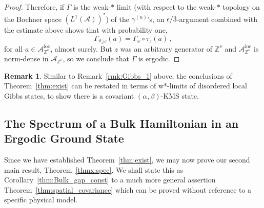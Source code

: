 \documentclass{article}
\newcommand{\Znu}{\mathbb{Z}^\nu}
\newcommand{\A}{\mathcal{A}}
\DeclareMathOperator{\loc}{loc}
\newcommand{\aloc}{\mathcal{A}_{\mathbb{Z}^\nu}^{\loc}}
\newcommand{\<}{\langle}
\renewcommand{\>}{\rangle}
\theoremstyle{definition}
\newtheorem{rmk}[thm]{Remark}
\numberwithin{equation}{section}
\begin{document}
\begin{proof}
	Therefore, if $\Gamma$ is the weak-$\ast$ limit (with respect to the weak-$\ast$ topology on the Bochner space $(L^1(\A))^*$) of the $\gamma^{(n)}$'s, an $\epsilon/3$-argument combined with the estimate above shows that with probability one,
	\begin{equation}
		\Gamma_{\vartheta_z \omega}(a) = \Gamma_\omega\circ \tau_z(a)\,,
	\end{equation} for all $a\in \aloc$, almost surely. But $z$ was an arbitrary generator of $\Znu$ and $\aloc$ is norm-dense in $\A_{\Znu}$, so we conclude that $\Gamma$ is ergodic. 
\end{proof}

\begin{rmk}
    Similar to Remark~\ref{rmk:Gibbs_1} above, the conclusions of Theorem~\ref{thm:exist} can be restated in terms of w*-limits of disordered local Gibbs states, to show there is a covariant $(\alpha, \beta)$-KMS state. 
\end{rmk}

\subsection{The Spectrum of a Bulk Hamiltonian in an Ergodic Ground State}
Since we have established Theorem~\ref{thm:exist}, we may now prove our second main result, Theorem~\ref{thmx:spec}. We shall state this as Corollary~\ref{thm:Bulk_gap_const} to a much more general assertion Theorem~\ref{thm:spatial_covariance} which can be proved without reference to a specific physical model. 
\end{document}

